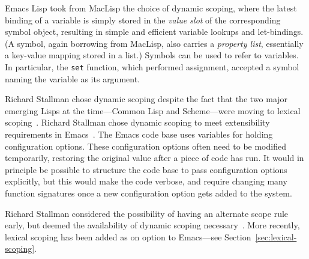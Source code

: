 \documentclass[format=acmsmall, review]{acmart}
\newcommand \Elisp {Emacs Lisp}
\begin{document}
\Elisp{} took from MacLisp the choice of dynamic scoping, where the
latest binding of a variable is simply stored in the \emph{value slot}
of the corresponding symbol object, resulting in simple and efficient
variable lookups and let-bindings.  (A symbol, again borrowing from
MacLisp, also carries a \textit{property list}, essentially a key-value
mapping stored in a list.)  Symbols can be used to refer to
variables.  In particular, the \texttt{set} function, which performed
assignment, accepted a symbol naming the variable as its argument. 

Richard
Stallman chose dynamic scoping despite the fact that the two major emerging
Lisps at the time---Common Lisp and Scheme---were moving to lexical
scoping~\cite{CLtL1,R2RS}.
Richard Stallman chose dynamic scoping to meet extensibility
requirements in Emacs~\cite{Stallman1981}.  The Emacs code base uses
variables for holding configuration options.  These configuration
options often need to be modified temporarily, restoring the original
value after a piece of code has run.  It would in principle be
possible to structure the code base to pass configuration options
explicitly, but this would make the code verbose, and require changing
many function signatures once a new configuration option gets added to
the system.

Richard Stallman considered the possibility of having an alternate
scope rule early, but deemed the availability of dynamic scoping
necessary~\cite{Stallman1981}.  More recently, lexical scoping has
been added as on option to Emacs---see
Section~\ref{sec:lexical-scoping}.
\end{document}
